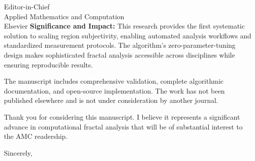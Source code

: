 \documentclass[11pt]{letter}
\begin{document}
\begin{letter}{Editor-in-Chief\\
Applied Mathematics and Computation\\
Elsevier}
\textbf{Significance and Impact:} This research provides the first systematic solution to scaling region subjectivity, enabling automated analysis workflows and standardized measurement protocols. The algorithm's zero-parameter-tuning design makes sophisticated fractal analysis accessible across disciplines while ensuring reproducible results.

The manuscript includes comprehensive validation, complete algorithmic documentation, and open-source implementation. The work has not been published elsewhere and is not under consideration by another journal.

Thank you for considering this manuscript. I believe it represents a significant advance in computational fractal analysis that will be of substantial interest to the AMC readership.

\closing{Sincerely,}

\end{letter}
\end{document}

